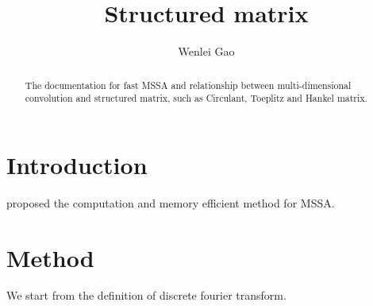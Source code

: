 \documentclass[revised,endfloat]{geophysics}
\begin{document}
\title{Structured matrix}
\renewcommand{\thefootnote}{\fnsymbol{footnote}}

\address{
\footnotemark[1]Department of Physics,\\
University of Alberta, \\
Edmonton, Alberta, Canada. \\}

\author{Wenlei Gao\footnotemark[1]} 

\maketitle


\begin{abstract}
The documentation for fast MSSA and relationship between multi-dimensional convolution and structured matrix, such as Circulant, Toeplitz and Hankel matrix.
\end{abstract}


\section{Introduction}
\citep{korobeynikov2009} proposed the computation and memory efficient method for MSSA.
                                                                 
\section{Method}
We start from the definition of discrete fourier transform.
\end{document}
